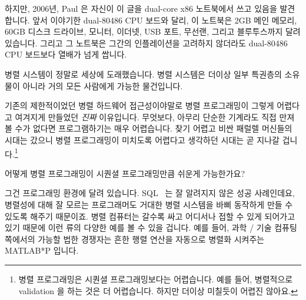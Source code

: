 	하지만, 2006년, Paul 은 자신이 이 글을 dual-core x86 노트북에서 쓰고
	있음을 발견합니다.
	앞서 이야기한 dual-80486 CPU 보드와 달리, 이 노트북은 2GB 메인 메모리,
	60GB 디스크 드라이브, 모니터, 이더넷, USB 포트, 무선랜, 그리고
	블루투스까지 달려 있습니다.
	그리고 그 노트북은 그간의 인플레이션을 고려하지 않더라도 dual-80486 CPU
	보드보다 열배가 넘게 쌉니다.

	병렬 시스템이 정말로 세상에 도래했습니다.
	병렬 시스템은 더이상 일부 특권층의 소유물이 아니라 거의 모든 사람에게
	가능한 물건입니다.

	기존의 제한적이었던 병렬 하드웨어 접근성이야말로 병렬 프로그래밍이
	그렇게 어렵다고 여겨지게 만들었던 \emph{진짜} 이유입니다.
	무엇보다, 아무리 단순한 기계라도 직접 만져볼 수가 없다면 프로그램하기는
	매우 어렵습니다.
	찾기 어렵고 비싼 패럴렐 머신들의 시대는 갔으니 병렬 프로그래밍이
	미치도록 어렵다고 생각하던 시대는 곧 지나갈 겁니다.\footnote{
		병렬 프로그래밍은 시퀀셜 프로그래밍보다는 어렵습니다. 예를
		들어, 병렬적으로 validation 을 하는 것은 더 어렵습니다.
		하지만 더이상 미칠듯이 어렵진 않아요.}

\QuickQ{}
	어떻게 병렬 프로그래밍이 시퀀셜 프로그래밍만큼 쉬운게 가능한가요?

\QuickA{}
	그건 프로그래밍 환경에 달려 있습니다.  SQL~\cite{DIS9075SQL92} 는 잘
	알려지지 않은 성공 사례인데요, 병렬성에 대해 잘 모르는 프로그래머도
	거대한 병렬 시스템을 바삐 동작하게 만들 수 있도록 해주기 때문이죠.
	병렬 컴퓨터는 갈수록 싸고 어디서나 접할 수 있게 되어가고 있기 때문에
	이런 류의 다양한 예를 볼 수 있을 겁니다.  예를 들어, 과학 / 기술 컴퓨팅
	쪽에서의 가능할 법한 경쟁자는 흔한 행렬 연산을 자동으로 병렬화 시켜주는
	MATLAB*P 입니다.

